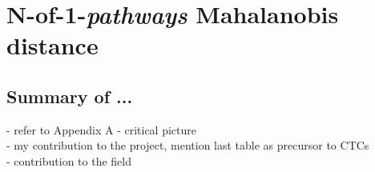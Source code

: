 \chapter{N-of-1-\emph{pathways} Mahalanobis distance} \label{Chap:md}


\section{Summary of ...} \label{sec:mdsummary}

- refer to Appendix A
- critical picture\\
- my contribution to the project, mention last table as precursor to CTCs\\ 
- contribution to the field\\

%
